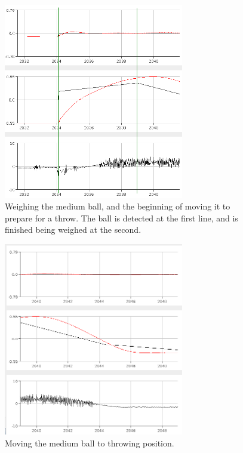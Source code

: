 \begin{figure}[h]
\centering
\includegraphics[width=0.7\textwidth]{figures/weighmediumball-crop.png}
\caption{Weighing the medium ball, and the beginning of moving it to prepare for a throw. The ball is detected at the first line, and is finished being weighed at the second.}
\label{fig:weighmediumball}
\end{figure}

\begin{figure}[h]
\centering
\includegraphics[width=0.7\textwidth]{figures/movemediumball-crop.png}
\caption{Moving the medium ball to throwing position.}
\label{fig:movemediumball}
\end{figure}

